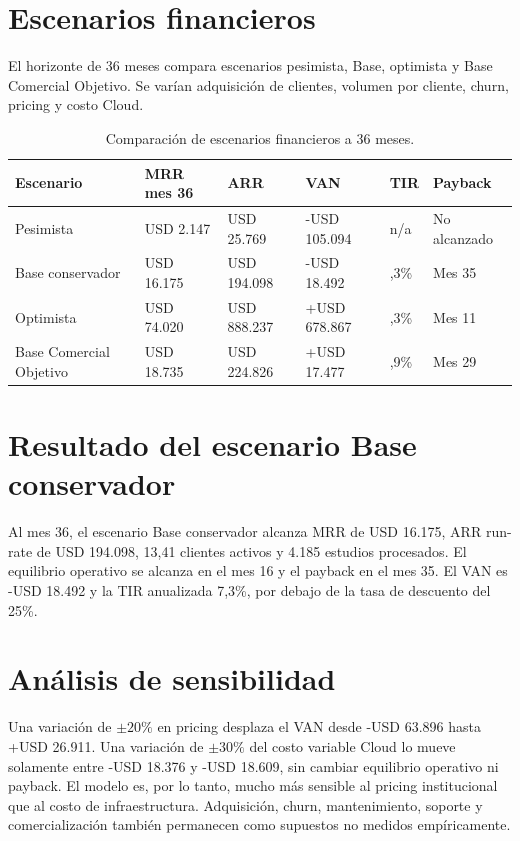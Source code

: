 \section{Escenarios financieros}

El horizonte de 36 meses compara escenarios pesimista, Base, optimista y Base Comercial Objetivo. Se varían adquisición de clientes, volumen por cliente, churn, pricing y costo Cloud.

{\scriptsize
\begin{longtable}{>{\raggedright\arraybackslash}p{} >{\raggedright\arraybackslash}p{} >{\raggedright\arraybackslash}p{} >{\raggedright\arraybackslash}p{} >{\raggedright\arraybackslash}p{} >{\raggedright\arraybackslash}p{}}
\caption{Comparación de escenarios financieros a 36 meses.}\label{tab:negocio-escenarios}\\
\hline
\textbf{Escenario} & \textbf{MRR mes 36} & \textbf{ARR} & \textbf{VAN} & \textbf{TIR} & \textbf{Payback} \\
\hline
Pesimista & USD 2.147 & USD 25.769 & -USD 105.094 & n/a & No alcanzado \\
Base conservador & USD 16.175 & USD 194.098 & -USD 18.492 & 7,3\% & Mes 35 \\
Optimista & USD 74.020 & USD 888.237 & +USD 678.867 & 541,3\% & Mes 11 \\
Base Comercial Objetivo & USD 18.735 & USD 224.826 & +USD 17.477 & 41,9\% & Mes 29 \\
\hline
\end{longtable}
}

\section{Resultado del escenario Base conservador}

Al mes 36, el escenario Base conservador alcanza MRR de USD 16.175, ARR run-rate de USD 194.098, 13,41 clientes activos y 4.185 estudios procesados. El equilibrio operativo se alcanza en el mes 16 y el payback en el mes 35. El VAN es -USD 18.492 y la TIR anualizada 7,3\%, por debajo de la tasa de descuento del 25\%.

\section{Análisis de sensibilidad}

Una variación de $\pm20\%$ en pricing desplaza el VAN desde -USD 63.896 hasta +USD 26.911. Una variación de $\pm30\%$ del costo variable Cloud lo mueve solamente entre -USD 18.376 y -USD 18.609, sin cambiar equilibrio operativo ni payback. El modelo es, por lo tanto, mucho más sensible al pricing institucional que al costo de infraestructura. Adquisición, churn, mantenimiento, soporte y comercialización también permanecen como supuestos no medidos empíricamente.

